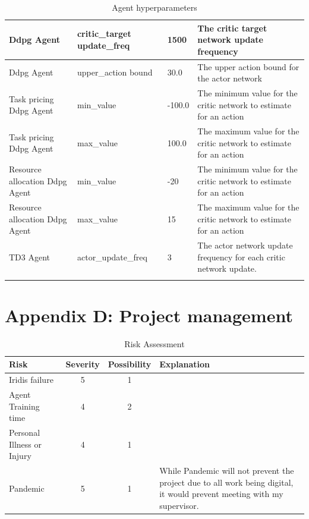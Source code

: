 \begin{longtable}{|p{2cm}|p{3.5cm}|p{2.5cm}|p{6cm}|}
        Ddpg Agent & critic\_target update\_freq & 1500 & The critic target network update frequency \\ \hline
        Ddpg Agent & upper\_action bound & 30.0 & The upper action bound for the actor network \\ \hline
        Task pricing Ddpg Agent & min\_value & -100.0 & The minimum value for the critic network to estimate for an
            action \\ \hline
        Task pricing Ddpg Agent & max\_value & 100.0 & The maximum value for the critic network to estimate for an
            action\\ \hline
        Resource allocation Ddpg Agent & min\_value & -20 & The minimum value for the critic network to estimate for an
            action \\ \hline
        Resource allocation Ddpg Agent & max\_value & 15 & The maximum value for the critic network to estimate for an
            action\\ \hline
        TD3 Agent & actor\_update\_freq & 3 & The actor network update frequency for each critic network update. \\ \hline
    \caption{Agent hyperparameters}
    \label{tab:agent_hyperparameters}
\end{longtable}

\section*{Appendix D: Project management} \label{app:project-management}

\begin{table}[h]
    \centering
    \begin{tabular}{|p{3cm}|c|c|p{7cm}|} \hline
        \textbf{Risk}  & \textbf{Severity} & \textbf{Possibility} & \textbf{Explanation} \\ \hline
        Iridis failure & 5 & 1 & \\ \hline
        Agent Training time & 4 & 2 & \\ \hline
        Personal Illness or Injury & 4 & 1 & \\ \hline
        Pandemic & 5 & 1 & While Pandemic will not prevent the project due to all work being digital, it would prevent
            meeting with my supervisor. \\ \hline
    \end{tabular}
    \caption{Risk Assessment}
    \label{tab:risk_assessment}
\end{table}

